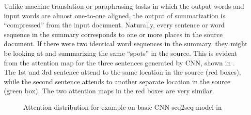 Unlike machine translation or paraphrasing tasks in which the output words
and input words are almost one-to-one aligned, the output of summarization
is ``compressed'' from the input document. Naturally, every sentence or 
word sequence in the summary corresponds to one or more places in the source
document. If there were two identical word sequences in the summary,
they might be looking at and summarizing the same ``spots'' in the source.
This is evident from the attention map for the three sentences generated by 
CNN, shown in . The 1st and 3rd sentence attend to
the same location in the source (red boxes), while the second
sentence attends to another separate location in the source (green box). 
The two attention maps in the red boxes are very similar.

\begin{figure}[th!]
\centering
{}
\quad
{}
\quad
{}
\caption{Attention distribution for example on basic CNN seq2seq model 
in }
\label{fig:attn_map}
\end{figure}


